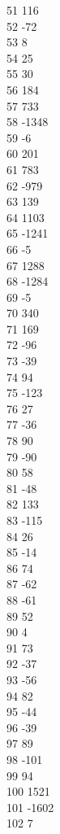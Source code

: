 { 51	116 \\
 52	-72 \\
 53	8 \\
 54	25 \\
 55	30 \\
 56	184 \\
 57	733 \\
 58	-1348 \\
 59	-6 \\
 60	201 \\
 61	783 \\
 62	-979 \\
 63	139 \\
 64	1103 \\
 65	-1241 \\
 66	-5 \\
 67	1288 \\
 68	-1284 \\
 69	-5 \\
 70	340 \\
 71	169 \\
 72	-96 \\
 73	-39 \\
 74	94 \\
 75	-123 \\
 76	27 \\
 77	-36 \\
 78	90 \\
 79	-90 \\
 80	58 \\
 81	-48 \\
 82	133 \\
 83	-115 \\
 84	26 \\
 85	-14 \\
 86	74 \\
 87	-62 \\
 88	-61 \\
 89	52 \\
 90	4 \\
 91	73 \\
 92	-37 \\
 93	-56 \\
 94	82 \\
 95	-44 \\
 96	-39 \\
 97	89 \\
 98	-101 \\
 99	94 \\
 100	1521 \\
 101	-1602 \\
 102	7 \\
}
